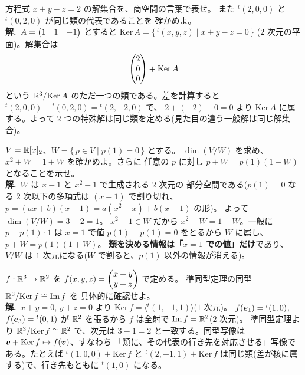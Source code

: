 \begin{rei}[例題・基本(解集合を類として読む)]\label{rei:quot-eq}
方程式 $x + y - z = 2$ の解集合を、商空間の言葉で表せ。
また ${}^t(2, 0, 0)$ と ${}^t(0, 2, 0)$ が同じ類の代表であることを
確かめよ。\\
\textbf{解.}\ $A = \begin{pmatrix}1 & 1 & -1\end{pmatrix}$ とすると
$\mathrm{Ker}\,A = \{\, {}^t(x, y, z) \mid x + y - z = 0 \,\}$
($2$ 次元の平面)。解集合は
\[
\begin{pmatrix}2 \\ 0 \\ 0\end{pmatrix} + \mathrm{Ker}\,A
\]
という $\mathbb{R}^3/\mathrm{Ker}\,A$ のただ一つの類である。差を計算すると
${}^t(2, 0, 0) - {}^t(0, 2, 0) = {}^t(2, -2, 0)$ で、
$2 + (-2) - 0 = 0$ より $\mathrm{Ker}\,A$ に属する。よって
$2$ つの特殊解は同じ類を定める(見た目の違う一般解は同じ解集合)。
\end{rei}

\begin{rei}[例題・標準(多項式の商空間)]\label{rei:quot-poly}
$V = \mathbb{R}[x]_2$、$W = \{\, p \in V \mid p(1) = 0 \,\}$ とする。
$\dim(V/W)$ を求め、$x^2 + W = 1 + W$ を確かめよ。さらに
任意の $p$ に対し $p + W = p(1)(1 + W)$ となることを示せ。\\
\textbf{解.}\ $W$ は $x - 1$ と $x^2 - 1$ で生成される $2$ 次元の
部分空間である($p(1) = 0$ なる $2$ 次以下の多項式は
$(x - 1)$ で割り切れ、$p = (ax + b)(x - 1) = a(x^2 - x) + b(x - 1)$ の形)。
よって $\dim(V/W) = 3 - 2 = 1$。
$x^2 - 1 \in W$ だから $x^2 + W = 1 + W$。一般に
$p - p(1) \cdot 1$ は $x = 1$ で値 $p(1) - p(1) = 0$ をとるから
$W$ に属し、$p + W = p(1)(1 + W)$。
\textbf{類を決める情報は「$x = 1$ での値」だけ}であり、
$V/W$ は $1$ 次元になる($W$ で割ると、$p(1)$ 以外の情報が消える)。
\end{rei}

\begin{rei}[例題・標準(準同型定理の適用)]\label{rei:quot-hom}
$f : \mathbb{R}^3 \to \mathbb{R}^2$ を $f(x, y, z) = \begin{pmatrix}x + y \\ y + z\end{pmatrix}$ で定める。
準同型定理の同型 $\mathbb{R}^3/\mathrm{Ker}\,f \cong \mathrm{Im}\,f$ を
具体的に確認せよ。\\
\textbf{解.}\ $x + y = 0$, $y + z = 0$ より
$\mathrm{Ker}\,f = \langle {}^t(1, -1, 1) \rangle$($1$ 次元)。
$f(\bm{e}_1) = {}^t(1, 0)$, $f(\bm{e}_3) = {}^t(0, 1)$ が
$\mathbb{R}^2$ を張るから $f$ は全射で $\mathrm{Im}\,f = \mathbb{R}^2$($2$ 次元)。
準同型定理より $\mathbb{R}^3/\mathrm{Ker}\,f \cong \mathbb{R}^2$ で、次元は
$3 - 1 = 2$ と一致する。同型写像は
$\bm{v} + \mathrm{Ker}\,f \mapsto f(\bm{v})$、すなわち
「類に、その代表の行き先を対応させる」写像である。たとえば
${}^t(1, 0, 0) + \mathrm{Ker}\,f$ と ${}^t(2, -1, 1) + \mathrm{Ker}\,f$
は同じ類(差が核に属する)で、行き先もともに ${}^t(1, 0)$ になる。
\end{rei}

